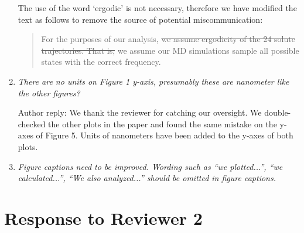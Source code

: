 \documentclass{article}
\begin{document}
\begin{enumerate}[label={Comment \theenumi :}, leftmargin=3.9\parindent]
    The use of the word `ergodic' is not necessary, therefore we have modified the text as follows
    to remove the source of potential miscommunication:
    
    \begin{quote}
    For the purposes of our analysis, \sout{we assume ergodicity of the 24 solute trajectories. That is,}
    we assume our MD simulations sample all possible states with the correct frequency.
    \end{quote}    
    
    \item \textit{There are no units on Figure 1 y-axis, presumably these are nanometer like the 
    other figures?}
    
    Author reply: We thank the reviewer for catching our oversight. We double-checked the 
    other plots in the paper and found the same mistake on the y-axes of Figure 5. Units of nanometers
    have been added to the y-axes of both plots.
    
    \item \textit{Figure captions need to be improved. Wording such as “we plotted...”, “we 
    calculated...”, “We also analyzed...” should be omitted in figure captions.}  


\end{enumerate}


\section*{Response to Reviewer 2}
\end{document}
